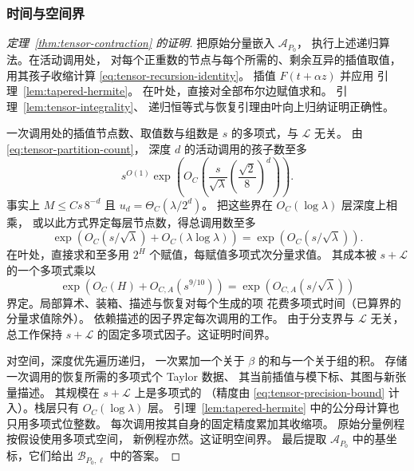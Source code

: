 \subsubsection{时间与空间界}
\label{subsec:tensor-cost}

\begin{proof}[定理~\ref{thm:tensor-contraction} 的证明]
把原始分量嵌入 $\mathcal A_{P_0}$，
执行上述递归算法。在活动调用处，
对每个正重数的节点与每个所需的、剩余互异的插值取值，
用其孩子收缩计算
\eqref{eq:tensor-recursion-identity}。
插值 $F(t+\alpha z)$ 并应用
引理~\ref{lem:tapered-hermite}。
在叶处，直接对全部布尔边赋值求和。
引理~\ref{lem:tensor-integrality}、
递归恒等式与恢复引理由叶向上归纳证明正确性。

一次调用处的插值节点数、取值数与组数是 $s$
的多项式，与 $\mathcal L$ 无关。
由 \eqref{eq:tensor-partition-count}，
深度 $d$ 的活动调用的孩子数至多
\[
 s^{O(1)}\exp\left(
       O_C\left(\frac{s}{\sqrt\lambda}
                    \left(\frac{\sqrt2}{8}\right)^d\right)\right).
\]
事实上 $M\le Cs\,8^{-d}$
且 $u_d=\Theta_C(\lambda/2^d)$。
把这些界在 $O_C(\log\lambda)$ 层深度上相乘，
或以此方式界定每层节点数，得总调用数至多
\[
 \exp\left(O_C(s/\sqrt\lambda)
                   +O_C(\lambda\log\lambda)\right)
       =\exp(O_C(s/\sqrt\lambda)).
\]
在叶处，直接求和至多用 $2^H$
个赋值，每赋值多项式次分量求值。
其成本被 $s+\mathcal L$
的一个多项式乘以
\[
 \exp(O_C(H)+O_{C,A}(s^{9/10}))
   =\exp(O_{C,A}(s/\sqrt\lambda))
\]
界定。局部算术、装箱、描述与恢复对每个生成的项
花费多项式时间（已算界的分量求值除外）。
依赖描述的因子界定每次调用的工作。
由于分支界与 $\mathcal L$ 无关，
总工作保持 $s+\mathcal L$
的固定多项式因子。这证明时间界。

对空间，深度优先遍历递归，
一次累加一个关于 $\beta$ 的和与一个关于组的积。
存储一次调用的恢复所需的多项式个 Taylor 数据、
其当前插值与模下标、其图与新张量描述。
其规模在 $s+\mathcal L$ 上是多项式的
（精度由 \eqref{eq:tensor-precision-bound}
计入）。栈层只有 $O_C(\log\lambda)$ 层。
引理~\ref{lem:tapered-hermite}
中的公分母计算也只用多项式位整数。
每次调用按其自身的固定精度累加其收缩项。
原始分量例程按假设使用多项式空间，
新例程亦然。这证明空间界。
最后提取 $\mathcal A_{P_0}$
中的基坐标，它们给出 $\mathcal B_{P_0,\ell}$
中的答案。
\end{proof}

